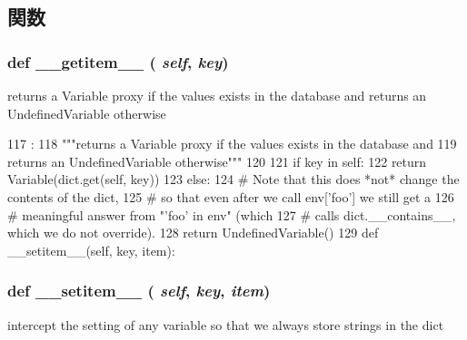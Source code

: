\subsection{関数}
\hypertarget{classm5_1_1util_1_1smartdict_1_1SmartDict_a50d766f4276c3d8fe330ac8cd344a75f}{
\subsubsection[{\_\-\_\-getitem\_\-\_\-}]{\setlength{\rightskip}{0pt plus 5cm}def \_\-\_\-getitem\_\-\_\- ( {\em self}, \/   {\em key})}}
\label{classm5_1_1util_1_1smartdict_1_1SmartDict_a50d766f4276c3d8fe330ac8cd344a75f}
\begin{DoxyVerb}returns a Variable proxy if the values exists in the database and
returns an UndefinedVariable otherwise\end{DoxyVerb}
 


\begin{DoxyCode}
117                               :
118         """returns a Variable proxy if the values exists in the database and
119         returns an UndefinedVariable otherwise"""
120 
121         if key in self:
122             return Variable(dict.get(self, key))
123         else:
124             # Note that this does *not* change the contents of the dict,
125             # so that even after we call env['foo'] we still get a
126             # meaningful answer from "'foo' in env" (which
127             # calls dict.__contains__, which we do not override).
128             return UndefinedVariable()
129 
    def __setitem__(self, key, item):
\end{DoxyCode}
\hypertarget{classm5_1_1util_1_1smartdict_1_1SmartDict_a09195b01147e970ca71c48b57f653940}{
\subsubsection[{\_\-\_\-setitem\_\-\_\-}]{\setlength{\rightskip}{0pt plus 5cm}def \_\-\_\-setitem\_\-\_\- ( {\em self}, \/   {\em key}, \/   {\em item})}}
\label{classm5_1_1util_1_1smartdict_1_1SmartDict_a09195b01147e970ca71c48b57f653940}
\begin{DoxyVerb}intercept the setting of any variable so that we always
store strings in the dict\end{DoxyVerb}
 


